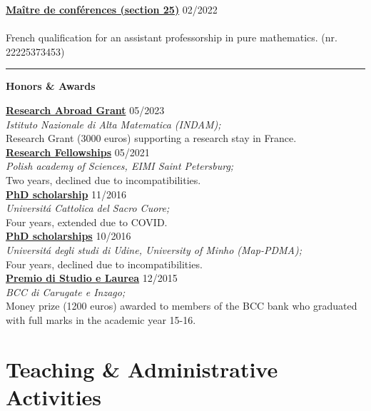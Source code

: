 \documentclass[a4paper]{article}
\newcommand{\block}[1]{\hrule \vspace{0.2cm} \textbf{\Large #1} \vspace{0.2cm}}
\newcommand{\voice}[5]{\href{#4}{\textbf{#1}} \hfill #2 \\ \textit{#3} \\ {\small #5} \vspace{0.2cm} \\}
\begin{document}
    
    \voice{Maître de conférences (section 25)}
        {02/2022}
        {\vspace{-0.5cm}}
        {https://www.galaxie.enseignementsup-recherche.gouv.fr/ensup/qualification/Resultats_2022/qualifies_MCF_2022.pdf}       
        {French qualification for an assistant professorship in pure mathematics.  (nr. 22225373453)}




    \block{Honors \& Awards}

    
    \voice{Research Abroad Grant}
        {05/2023}
        {Istituto Nazionale di Alta Matematica (INDAM);}
        {https://www.altamatematica.it/wp-content/uploads/2022/12/bando-estero-2022-2023-1.pdf}       
        {Research Grant (3000 euros) supporting a research stay in France.}
    \voice{Research Fellowships}
        {05/2021}
        {Polish academy of Sciences, EIMI Saint Petersburg;}
        {}       
        {Two years, declined due to incompatibilities.}
    \voice{PhD scholarship}
        {11/2016}
        {Universit\'a Cattolica del Sacro Cuore;}
        {https://www.dropbox.com/s/pmsg20xsxd6x5yf/External_Scholarship.pdf?dl=0}       
        {Four years, extended due to COVID.}
    \voice{PhD scholarships}
        {10/2016}
        {Universit\'a degli studi di Udine, University of Minho (Map-PDMA);}
        {}       
        {Four years, declined due to incompatibilities.}
    \voice{Premio di Studio e Laurea}
        {12/2015}
        {BCC di Carugate e Inzago;}
        {https://web.archive.org/web/20191207203437/https://www.bccmilano.it/news/dettaglio_news_div.asp?i_menuID=54872&hNewsID=132411}       
        {Money prize (1200 euros) awarded to members of the BCC bank who graduated with full marks in the academic year 15-16.}

















	\clearpage
	\section*{Teaching \& Administrative Activities}
\end{document}
